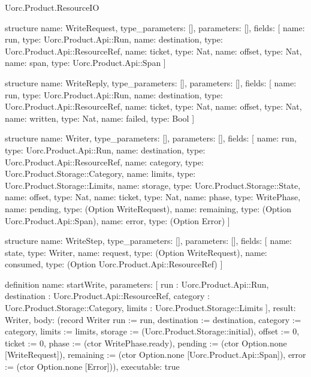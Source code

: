 \begin{lexlean}{Uorc.Product.ResourceIO}
\begin{semanticmodule}
structure{
  name: WriteRequest,
  type_parameters: [],
  parameters: [],
  fields: [
    {name: run, type: Uorc.Product.Api::Run},
    {name: destination, type: Uorc.Product.Api::ResourceRef},
    {name: ticket, type: Nat},
    {name: offset, type: Nat},
    {name: span, type: Uorc.Product.Api::Span}
  ]
}

structure{
  name: WriteReply,
  type_parameters: [],
  parameters: [],
  fields: [
    {name: run, type: Uorc.Product.Api::Run},
    {name: destination, type: Uorc.Product.Api::ResourceRef},
    {name: ticket, type: Nat},
    {name: offset, type: Nat},
    {name: written, type: Nat},
    {name: failed, type: Bool}
  ]
}

structure{
  name: Writer,
  type_parameters: [],
  parameters: [],
  fields: [
    {name: run, type: Uorc.Product.Api::Run},
    {name: destination, type: Uorc.Product.Api::ResourceRef},
    {name: category, type: Uorc.Product.Storage::Category},
    {name: limits, type: Uorc.Product.Storage::Limits},
    {name: storage, type: Uorc.Product.Storage::State},
    {name: offset, type: Nat},
    {name: ticket, type: Nat},
    {name: phase, type: WritePhase},
    {name: pending, type: (Option WriteRequest)},
    {name: remaining, type: (Option Uorc.Product.Api::Span)},
    {name: error, type: (Option Error)}
  ]
}

structure{
  name: WriteStep,
  type_parameters: [],
  parameters: [],
  fields: [
    {name: state, type: Writer},
    {name: request, type: (Option WriteRequest)},
    {name: consumed, type: (Option Uorc.Product.Api::ResourceRef)}
  ]
}

definition{
  name: startWrite,
  parameters: [
    run : Uorc.Product.Api::Run,
    destination : Uorc.Product.Api::ResourceRef,
    category : Uorc.Product.Storage::Category,
    limits : Uorc.Product.Storage::Limits
  ],
  result: Writer,
  body: (record Writer {run := run, destination := destination, category := category, limits := limits, storage := (Uorc.Product.Storage::initial), offset := 0, ticket := 0, phase := (ctor WritePhase.ready), pending := (ctor Option.none [WriteRequest]), remaining := (ctor Option.none [Uorc.Product.Api::Span]), error := (ctor Option.none [Error])}),
  executable: true
}


\end{semanticmodule}
\end{lexlean}
